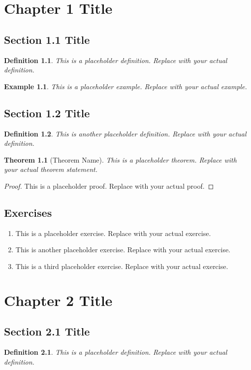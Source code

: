 \documentclass[11pt]{book}
\newtheorem{definition}{Definition}[chapter]
\newtheorem{theorem}{Theorem}[chapter]
\newtheorem{example}{Example}[chapter]
\begin{document}
\chapter{Chapter 1 Title}
\section{Section 1.1 Title}
\begin{definition}
This is a placeholder definition. Replace with your actual definition.
\end{definition}

\begin{example}
This is a placeholder example. Replace with your actual example.
\end{example}

\section{Section 1.2 Title}
\begin{definition}
This is another placeholder definition. Replace with your actual definition.
\end{definition}

\begin{theorem}[Theorem Name]
This is a placeholder theorem. Replace with your actual theorem statement.
\end{theorem}

\begin{proof}
This is a placeholder proof. Replace with your actual proof.
\end{proof}

\section{Exercises}
\begin{enumerate}
\item This is a placeholder exercise. Replace with your actual exercise.
\item This is another placeholder exercise. Replace with your actual exercise.
\item This is a third placeholder exercise. Replace with your actual exercise.
\end{enumerate}

\chapter{Chapter 2 Title}
\section{Section 2.1 Title}
\begin{definition}
This is a placeholder definition. Replace with your actual definition.
\end{definition}
\end{document}

